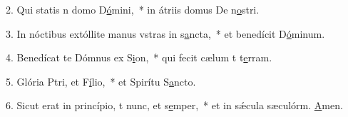 2. Qui statis n domo D\uline{ó}mini,~* in átriis domus De n\uline{o}stri.\par 
3. In nóctibus extóllite manus vstras in s\uline{a}ncta,~* et benedícit D\uline{ó}minum.\par 
4. Benedícat te Dómnus ex S\uline{i}on,~* qui fecit cælum t t\uline{e}rram.\par 
5. Glória Ptri, et F\uline{í}lio,~* et Spirítu S\uline{a}ncto.\par 
6. Sicut erat in princípio, t nunc, et s\uline{e}mper,~* et in sǽcula sæculórm. \uline{A}men.\par 
